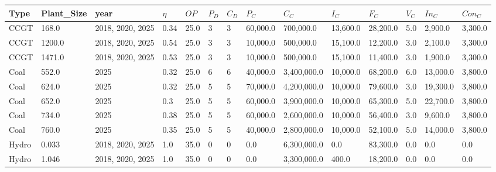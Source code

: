 \begin{table*}[]
	\begin{tabularx}{\linewidth}{|p{}|l|x|l|l|l|l|l|l|l|l|l|l|l|}
\hline
Type                          & Plant\_Size & year             & $\eta$ & $OP$ & $P_D$ & $C_D$ & $P_C$     & $C_C$       & $I_C$     & $F_C$    & $V_C$ & $In_C$   & $Con_C$   \\ \hline
CCGT                          & 168.0       & 2018, 2020, 2025 & 0.34   & 25.0 & 3     & 3     & 60,000.0  & 700,000.0   & 13,600.0  & 28,200.0 & 5.0   & 2,900.0  & 3,300.0   \\ \hline
CCGT                          & 1200.0      & 2018, 2020, 2025 & 0.54   & 25.0 & 3     & 3     & 10,000.0  & 500,000.0   & 15,100.0  & 12,200.0 & 3.0   & 2,100.0  & 3,300.0   \\ \hline
CCGT                          & 1471.0      & 2018, 2020, 2025 & 0.53   & 25.0 & 3     & 3     & 10,000.0  & 500,000.0   & 15,100.0  & 11,400.0 & 3.0   & 1,900.0  & 3,300.0   \\ \hline
Coal                          & 552.0       & 2025             & 0.32   & 25.0 & 6     & 6     & 40,000.0  & 3,400,000.0 & 10,000.0  & 68,200.0 & 6.0   & 13,000.0 & 3,800.0   \\ \hline
Coal                          & 624.0       & 2025             & 0.32   & 25.0 & 5     & 5     & 70,000.0  & 4,200,000.0 & 10,000.0  & 79,600.0 & 3.0   & 19,300.0 & 3,800.0   \\ \hline
Coal                          & 652.0       & 2025             & 0.3    & 25.0 & 5     & 5     & 60,000.0  & 3,900,000.0 & 10,000.0  & 65,300.0 & 5.0   & 22,700.0 & 3,800.0   \\ \hline
Coal                          & 734.0       & 2025             & 0.38   & 25.0 & 5     & 5     & 60,000.0  & 2,600,000.0 & 10,000.0  & 56,400.0 & 3.0   & 9,600.0  & 3,800.0   \\ \hline
Coal                          & 760.0       & 2025             & 0.35   & 25.0 & 5     & 5     & 40,000.0  & 2,800,000.0 & 10,000.0  & 52,100.0 & 5.0   & 14,000.0 & 3,800.0   \\ \hline
Hydro                         & 0.033       & 2018, 2020, 2025 & 1.0    & 35.0 & 0     & 0     & 0.0       & 6,300,000.0 & 0.0       & 83,300.0 & 0.0   & 0.0      & 0.0       \\ \hline
Hydro                         & 1.046       & 2018, 2020, 2025 & 1.0    & 35.0 & 0     & 0     & 0.0       & 3,300,000.0 & 400.0     & 18,200.0 & 0.0   & 0.0      & 0.0       \\ \hline

\end{tabularx}
\end{table*}
